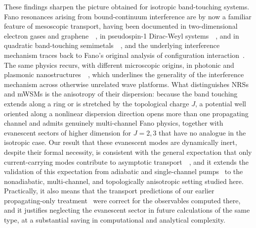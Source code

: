 \documentclass[aps,prb,onecolumn,longbibliography,nofootinbib,citeautoscript,10pt]{revtex4-2}
\begin{document}
These findings sharpen the picture obtained for isotropic band-touching systems. Fano resonances arising from bound-continuum interference are by now a familiar feature of mesoscopic transport, having been documented in two-dimensional electron gases and graphene~\cite{Zhu15,reichl199,Dai2014,Tekman93} \,,  in pseudospin-1 Dirac-Weyl systems~\cite{Zhu17} \,,  and in quadratic band-touching semimetals~\cite{bera2021} \,,  and the underlying interference mechanism traces back to Fano's original analysis of configuration interaction~\cite{Fano61}. The same physics recurs, with different microscopic origins, in photonic and plasmonic nanostructures~\cite{Cui2019,Sun2014,Karmakar19} \,,  which underlines the generality of the interference mechanism across otherwise unrelated wave platforms. What distinguishes NRSs and mWSMs is the anisotropy of their dispersion: because the band touching extends along a ring or is stretched by the topological charge $J$, a potential well oriented along a nonlinear dispersion direction opens more than one propagating channel and admits genuinely multi-channel Fano physics, together with evanescent sectors of higher dimension for $J=2,3$ that have no analogue in the isotropic case. Our result that these evanescent modes are dynamically inert, despite their formal necessity, is consistent with the general expectation that only current-carrying modes contribute to asymptotic transport~\cite{beenakker03} \,,  and it extends the validation of this expectation from adiabatic and single-channel pumps~\cite{brouwer98,avron01,kamenev00} to the nonadiabatic, multi-channel, and topologically anisotropic setting studied here. Practically, it also means that the transport predictions of our earlier propagating-only treatment~\cite{bera2023} were correct for the observables computed there, and it justifies neglecting the evanescent sector in future calculations of the same type, at a substantial saving in computational and analytical complexity.
\end{document}
